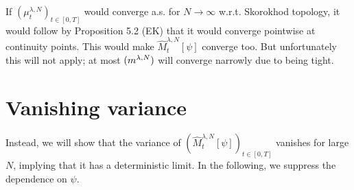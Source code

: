 \documentclass{article}
\begin{document}
If $(\mu_t^{\lambda, N})_{t\in[0,T]}$ would converge a.s. for $N\to\infty$ w.r.t. Skorokhod topology, it would follow by Proposition 5.2 (EK) that it would converge pointwise at continuity points.
This would make $\widehat{M}_t^{\lambda, N}[\psi]$ converge too.
But unfortunately this will not apply; at most $(m^{\lambda,N})$ will converge narrowly due to being tight.


\section{Vanishing variance}

Instead, we will show that the variance of $(\widehat{M}_t^{\lambda,N}[\psi])_{t\in[0,T]}$ vanishes for large $N$, implying that it has a deterministic limit.
In the following, we suppress the dependence on $\psi$.
\end{document}
